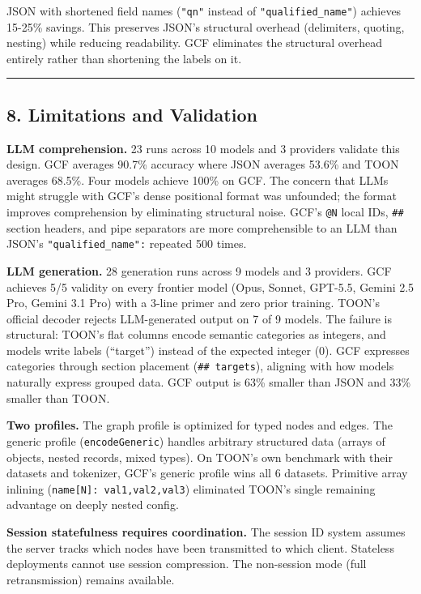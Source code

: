 \documentclass[
  11pt,
  paper=a4,
  ,captions=tableheading
]{scrartcl}
\begin{document}
JSON with shortened field names (\texttt{"qn"} instead of
\texttt{"qualified\_name"}) achieves 15-25\% savings. This preserves
JSON's structural overhead (delimiters, quoting, nesting) while reducing
readability. GCF eliminates the structural overhead entirely rather than
shortening the labels on it.

\begin{center}\rule{0.5\linewidth}{0.5pt}\end{center}

\subsection{8. Limitations and
Validation}\label{limitations-and-validation}

\textbf{LLM comprehension.} 23 runs across 10 models and 3 providers
validate this design. GCF averages 90.7\% accuracy where JSON averages
53.6\% and TOON averages 68.5\%. Four models achieve 100\% on GCF. The
concern that LLMs might struggle with GCF's dense positional format was
unfounded; the format improves comprehension by eliminating structural
noise. GCF's \texttt{@N} local IDs, \texttt{\#\#} section headers, and
\texttt{\textbar{}} pipe separators are more comprehensible to an LLM
than JSON's \texttt{"qualified\_name":} repeated 500 times.

\textbf{LLM generation.} 28 generation runs across 9 models and 3
providers. GCF achieves 5/5 validity on every frontier model (Opus,
Sonnet, GPT-5.5, Gemini 2.5 Pro, Gemini 3.1 Pro) with a 3-line primer
and zero prior training. TOON's official decoder rejects LLM-generated
output on 7 of 9 models. The failure is structural: TOON's flat columns
encode semantic categories as integers, and models write labels
(``target'') instead of the expected integer (0). GCF expresses
categories through section placement (\texttt{\#\#\ targets}), aligning
with how models naturally express grouped data. GCF output is 63\%
smaller than JSON and 33\% smaller than TOON.

\textbf{Two profiles.} The graph profile is optimized for typed nodes
and edges. The generic profile (\texttt{encodeGeneric}) handles
arbitrary structured data (arrays of objects, nested records, mixed
types). On TOON's own benchmark with their datasets and tokenizer, GCF's
generic profile wins all 6 datasets. Primitive array inlining
(\texttt{name{[}N{]}:\ val1,val2,val3}) eliminated TOON's single
remaining advantage on deeply nested config.

\textbf{Session statefulness requires coordination.} The session ID
system assumes the server tracks which nodes have been transmitted to
which client. Stateless deployments cannot use session compression. The
non-session mode (full retransmission) remains available.
\end{document}
